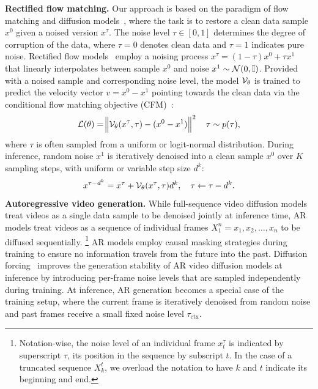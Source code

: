 \documentclass{article}
\theoremstyle{plain}
\theoremstyle{definition}
\theoremstyle{remark}
\begin{document}
\textbf{Rectified flow matching.} Our approach is based on the paradigm of flow matching and diffusion models~\citep{lipman2022flow}, where the task is to restore a clean data sample $x^0$ given a noised version $x^\tau$.
The noise level $\tau \in [0, 1]$ determines the degree of corruption of the data, where $\tau=0$ denotes clean data and $\tau=1$ indicates pure noise.
Rectified flow models~\citep{lipman2022flow,albergo2023building} employ a noising process $x^\tau = (1-\tau)x^0 + \tau x^1$ that linearly interpolates between sample $x^0$ and noise $x^1 \sim \mathcal{N}(0,{\mathbb{I}})$. 
Provided with a noised sample and corresponding noise level, the model ${\mathcal{V}}_\theta$ is trained to predict the velocity vector $v = x^0 - x^1$ pointing towards the clean data via the conditional flow matching objective (CFM)~\citep{lipman2022flow}: 
\begin{equation}
    \mathcal{L}(\theta) = \norm{{\mathcal{V}}_\theta (x^\tau, \tau) - (x^0 - x^1)}^2 \quad \tau \sim p(\tau),
\end{equation}
where $\tau$ is often sampled from a uniform or logit-normal distribution.
During inference, random noise $x^1$ is iteratively denoised into a clean sample $x^0$ over $K$ sampling steps, with uniform or variable step size $d^k$:
%
\begin{equation}
    x^{\tau - d^k} = x^\tau + {\mathcal{V}}_\theta (x^\tau, \tau) d^k, \quad \tau \leftarrow \tau - d^k.
\end{equation}
\textbf{Autoregressive video generation.} While full-sequence video diffusion models treat videos as a single data sample to be denoised jointly at inference time, AR models treat videos as a sequence of individual frames $X^{n}_1 = x_1,x_2,\dots,x_n$ to be diffused sequentially.
\footnote{Notation-wise, the noise level of an individual frame $x^\tau_t$ is indicated by superscript $\tau$, its position in the sequence by subscript $t$.
In the case of a truncated sequence $X_k^{t}$, we overload the notation to have $k$ and $t$ indicate its beginning and end.} AR models employ causal masking strategies during training to ensure no information travels from the future into the past. Diffusion forcing~\citep{chen2024diffusion}
improves the generation stability of AR video diffusion models at inference by introducing per-frame noise levels that are sampled independently during training.
At inference, AR generation becomes a special case of the training setup, where the current frame is iteratively denoised from random noise and past frames receive a small fixed noise level $\tau_\text{ctx}$.
\end{document}
